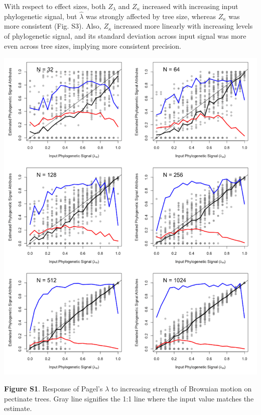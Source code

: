 \documentclass[
]{article}
\begin{document}
With respect to effect sizes, both \(Z_{\lambda}\) and \(Z_{\kappa}\)
increased with increasing input phylogenetic signal, but
\(\hat{\lambda}\) was strongly affected by tree size, whereas
\(Z_{\kappa}\) was more consistent (Fig. S3). Also, \(Z_{\kappa}\)
increased more linearly with increasing levels of phylogenetic signal,
and its standard deviation across input signal was more even across tree
sizes, implying more consistent precision.

\includegraphics[width=0.95\linewidth]{fig.S1}

\textbf{Figure S1}. Response of Pagel's \(\lambda\) to increasing
strength of Brownian motion on pectinate trees. Gray line signifies the
1:1 line where the input value matches the estimate.
\end{document}
